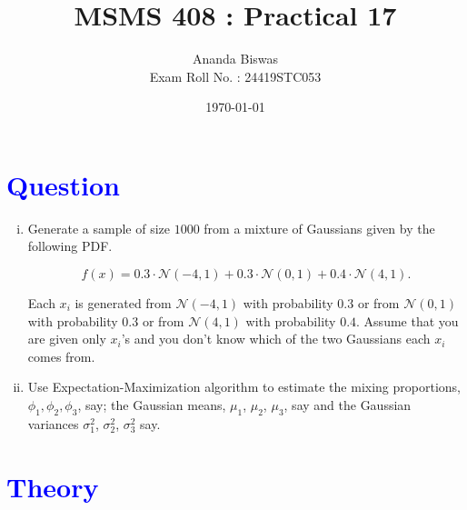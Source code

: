 \documentclass[11pt, a4paper]{article}\usepackage[]{graphicx}\usepackage[]{xcolor}
\title{MSMS 408 : Practical 17}
\author{{\fontsize{25}{20} \benyorithafont Ananda Biswas} \\[1em] Exam Roll No. : 24419STC053}
\date{\today}
\begin{document}
\maketitle


\section*{\faArrowAltCircleRight[regular] \textcolor{blue}{Question}}

\begin{enumerate}[(i)]
\item Generate a sample of size $1000$ from a mixture of Gaussians given by the following PDF.

$$f(x) = 0.3 \cdot \mathcal{N}(-4, 1) + 0.3 \cdot \mathcal{N}(0, 1) + 0.4 \cdot \mathcal{N}(4, 1).$$

Each $x_i$ is generated from $\mathcal{N}(-4, 1)$ with probability $0.3$ or from $\mathcal{N}(0, 1)$ with probability $0.3$ or from $\mathcal{N}(4, 1)$ with probability $0.4$. Assume that you are given only $x_i$'s and you don't know which of the two Gaussians each $x_i$ comes from.

\item Use Expectation-Maximization algorithm to estimate the mixing proportions, $\phi_1, \phi_2, \phi_3$, say; the Gaussian means, $\mu_1$, $\mu_2$, $\mu_3$, say and the Gaussian variances $\sigma_1^2$, $\sigma_2^2$, $\sigma_3^2$ say.
\end{enumerate}


\section*{\faArrowAltCircleRight[regular] \textcolor{blue}{Theory}}

\vspace{1cm}
\end{document}
